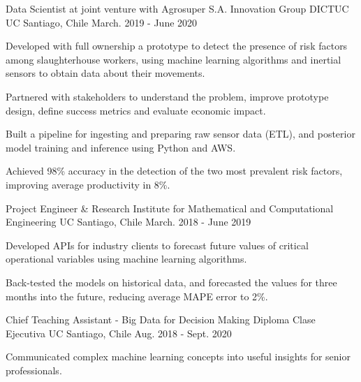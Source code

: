 \begin{cventries}
\cventry
{Data Scientist at joint venture with Agrosuper S.A. Innovation Group} %
{DICTUC UC} %
{Santiago, Chile} %
{March. 2019 - June 2020} %
{
  \begin{cvitems} %
    \item {Developed with full ownership a prototype to detect the presence of risk factors among slaughterhouse workers, using
    machine learning algorithms and inertial sensors to obtain data about their movements.}
    \item {Partnered with stakeholders to understand the problem, improve prototype design, define success metrics and evaluate economic impact.}
    \item {Built a pipeline for ingesting and preparing raw sensor data (ETL), and posterior model training and inference using Python and AWS.}
    \item {Achieved 98\% accuracy in the detection of the two most prevalent risk factors, improving average productivity in 8\%.}
  \end{cvitems}
}
\cventry
{Project Engineer \& Research} %
{Institute for Mathematical and Computational Engineering UC} %
{Santiago, Chile} %
{March. 2018 - June 2019} %
{
  \begin{cvitems} %
    \item {Developed APIs for industry clients to forecast future values of critical operational variables using machine learning algorithms.}
    \item {Back-tested the models on historical data, and forecasted the values for three months into the future, reducing average MAPE error to 2\%.}
  \end{cvitems}
}


\cventry
{Chief Teaching Assistant - Big Data for Decision Making Diploma}
{Clase Ejecutiva UC} %
{Santiago, Chile} %
{Aug. 2018 - Sept. 2020} %
{
  \begin{cvitems} %
    \item {Communicated complex machine learning concepts into useful insights for senior professionals.}
  \end{cvitems}
}


\end{cventries}

